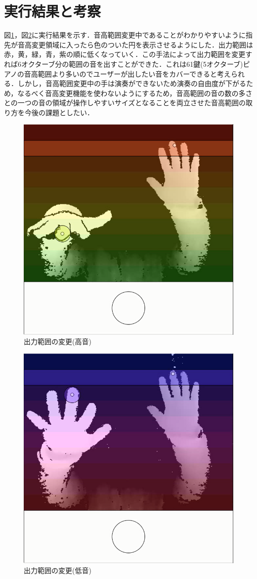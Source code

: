 \section{実行結果と考察}
図\ref{img:red}，図\ref{img:blue}に実行結果を示す．音高範囲変更中であることがわかりやすいように指先が音高変更領域に入ったら色のついた円を表示させるようにした．出力範囲は赤，黄，緑，青，紫の順に低くなっていく．この手法によって出力範囲を変更すれば6オクターブ分の範囲の音を出すことができた．これは61鍵(5オクターブ)ピアノの音高範囲より多いのでユーザーが出したい音をカバーできると考えられる．しかし，音高範囲変更中の手は演奏ができないため演奏の自由度が下がるため，なるべく音高変更機能を使わないようにするため，音高範囲の音の数の多さとの一つの音の領域が操作しやすいサイズとなることを両立させた音高範囲の取り方を今後の課題としたい．
\begin{figure}[htbt]
	\begin{center}
		\includegraphics[width=0.5\linewidth]{./pics/04/red.png}
		\caption{出力範囲の変更(高音)}
		\label{img:red} 
	\end{center}
\end{figure}

\begin{figure}[htbt]
	\begin{center}
		\includegraphics[width=0.5\linewidth]{./pics/04/blue.png}
		\caption{出力範囲の変更(低音)}
		\label{img:blue} 
	\end{center}
\end{figure}